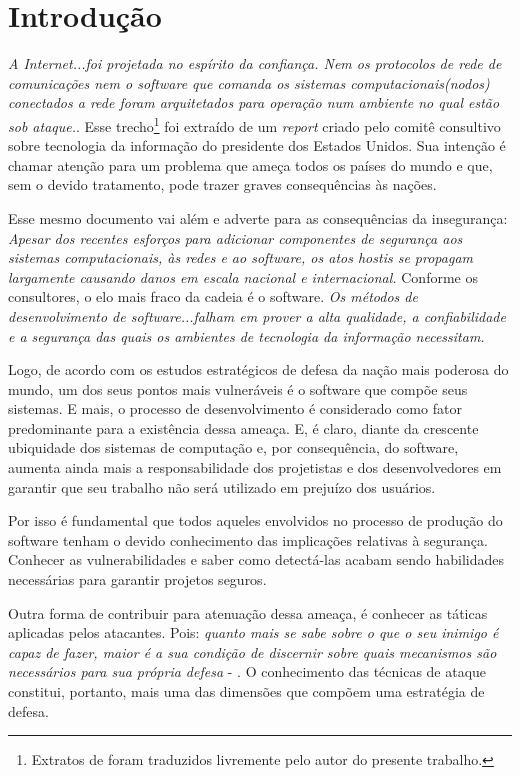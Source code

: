 
\chapter{Introdução}
\label{chap:introducao}

	\textsl{A Internet...foi projetada no espírito da confiança. Nem os protocolos
		de rede de comunicações nem o software que comanda os sistemas computacionais(nodos)
		conectados a rede foram arquitetados para operação num ambiente 
		no qual estão sob ataque.}\cite{PITAC2005}. 
	Esse trecho\footnote{Extratos de \cite{PITAC2005} foram traduzidos livremente pelo autor do presente trabalho.}
	foi extraído de um \textsl{report} criado pelo comitê consultivo sobre tecnologia da
	informação do presidente dos Estados Unidos. Sua intenção é chamar atenção para
	um problema que ameça todos os países do mundo e que, sem o devido tratamento,
	pode trazer graves consequências às nações.


	Esse mesmo documento vai além e adverte para as consequências da insegurança:
	\textsl{Apesar dos recentes esforços para adicionar componentes de segurança aos
		sistemas computacionais, às redes e ao software, os atos hostis
		se propagam largamente causando danos em escala nacional e internacional.}
	Conforme os consultores, o elo mais fraco da cadeia é o software.
	\textsl{Os métodos de desenvolvimento de software...falham em prover
		a alta qualidade, a confiabilidade e a segurança das quais os ambientes
		de tecnologia da informação necessitam.}


	Logo, de acordo com os estudos estratégicos de defesa da nação mais poderosa do mundo,
	um dos seus pontos mais vulneráveis é o software que compõe seus sistemas. E mais,
	o processo de desenvolvimento é considerado como fator predominante para a existência
	dessa ameaça. E, é claro, diante da crescente ubiquidade dos sistemas de computação e, 
	por consequência, do software, aumenta ainda mais a responsabilidade dos projetistas e 
	dos desenvolvedores em garantir que seu trabalho não será utilizado em prejuízo dos usuários.


	Por isso é fundamental que todos aqueles envolvidos no processo de produção
	do software tenham o devido conhecimento das implicações relativas à segurança.
	Conhecer as vulnerabilidades e saber como detectá-las acabam sendo habilidades
	necessárias para garantir projetos seguros.

	
	Outra forma de contribuir para atenuação dessa ameaça, é conhecer as táticas aplicadas
	pelos atacantes. Pois: \textsl{quanto mais se sabe sobre o que o seu inimigo é capaz de fazer,
	maior é a sua condição de discernir sobre quais mecanismos são necessários para sua própria
	defesa} - \cite{Harris2008}. O conhecimento das técnicas de ataque 
	constitui, portanto, mais uma das dimensões que compõem uma estratégia de defesa.	

